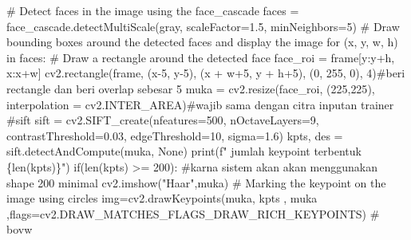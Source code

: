 \documentclass[
  letterpaper,
  DIV=11,
  numbers=noendperiod]{scrreprt}
\newenvironment{Shaded}{\begin{snugshade}}{\end{snugshade}}
\newcommand{\BuiltInTok}[1]{\textcolor[rgb]{0.00,0.23,0.31}{#1}}
\newcommand{\CommentTok}[1]{\textcolor[rgb]{0.37,0.37,0.37}{#1}}
\newcommand{\ControlFlowTok}[1]{\textcolor[rgb]{0.00,0.23,0.31}{#1}}
\newcommand{\DecValTok}[1]{\textcolor[rgb]{0.68,0.00,0.00}{#1}}
\newcommand{\FloatTok}[1]{\textcolor[rgb]{0.68,0.00,0.00}{#1}}
\newcommand{\KeywordTok}[1]{\textcolor[rgb]{0.00,0.23,0.31}{#1}}
\newcommand{\NormalTok}[1]{\textcolor[rgb]{0.00,0.23,0.31}{#1}}
\newcommand{\OperatorTok}[1]{\textcolor[rgb]{0.37,0.37,0.37}{#1}}
\newcommand{\SpecialCharTok}[1]{\textcolor[rgb]{0.37,0.37,0.37}{#1}}
\newcommand{\SpecialStringTok}[1]{\textcolor[rgb]{0.13,0.47,0.30}{#1}}
\newcommand{\StringTok}[1]{\textcolor[rgb]{0.13,0.47,0.30}{#1}}
\newcommand{\VariableTok}[1]{\textcolor[rgb]{0.07,0.07,0.07}{#1}}
\begin{document}
\begin{Shaded}
\begin{Highlighting}[]
        \CommentTok{\# Detect faces in the image using the face\_cascade}
\NormalTok{        faces }\OperatorTok{=}\NormalTok{ face\_cascade.detectMultiScale(gray, scaleFactor}\OperatorTok{=}\FloatTok{1.5}\NormalTok{, minNeighbors}\OperatorTok{=}\DecValTok{5}\NormalTok{)}
        \CommentTok{\# Draw bounding boxes around the detected faces and display the image}
        \ControlFlowTok{for}\NormalTok{ (x, y, w, h) }\KeywordTok{in}\NormalTok{ faces:}
            \CommentTok{\# Draw a rectangle around the detected face}
\NormalTok{            face\_roi }\OperatorTok{=}\NormalTok{ frame[y:y}\OperatorTok{+}\NormalTok{h, x:x}\OperatorTok{+}\NormalTok{w]}
\NormalTok{            cv2.rectangle(frame, (x}\OperatorTok{{-}}\DecValTok{5}\NormalTok{, y}\OperatorTok{{-}}\DecValTok{5}\NormalTok{), (x }\OperatorTok{+}\NormalTok{ w}\OperatorTok{+}\DecValTok{5}\NormalTok{, y }\OperatorTok{+}\NormalTok{ h}\OperatorTok{+}\DecValTok{5}\NormalTok{), (}\DecValTok{0}\NormalTok{, }\DecValTok{255}\NormalTok{, }\DecValTok{0}\NormalTok{), }\DecValTok{4}\NormalTok{)}\CommentTok{\#beri rectangle dan beri overlap sebesar 5}
\NormalTok{            muka }\OperatorTok{=}\NormalTok{ cv2.resize(face\_roi, (}\DecValTok{225}\NormalTok{,}\DecValTok{225}\NormalTok{), interpolation }\OperatorTok{=}\NormalTok{ cv2.INTER\_AREA)}\CommentTok{\#wajib sama dengan citra inputan trainer}
            \CommentTok{\#sift}
\NormalTok{            sift }\OperatorTok{=}\NormalTok{ cv2.SIFT\_create(nfeatures}\OperatorTok{=}\DecValTok{500}\NormalTok{, nOctaveLayers}\OperatorTok{=}\DecValTok{9}\NormalTok{, contrastThreshold}\OperatorTok{=}\FloatTok{0.03}\NormalTok{, edgeThreshold}\OperatorTok{=}\DecValTok{10}\NormalTok{, sigma}\OperatorTok{=}\FloatTok{1.6}\NormalTok{)}
\NormalTok{            kpts, des }\OperatorTok{=}\NormalTok{ sift.detectAndCompute(muka, }\VariableTok{None}\NormalTok{)}
            \BuiltInTok{print}\NormalTok{(}\SpecialStringTok{f" jumlah keypoint terbentuk }\SpecialCharTok{\{}\BuiltInTok{len}\NormalTok{(kpts)}\SpecialCharTok{\}}\SpecialStringTok{"}\NormalTok{)}
            \ControlFlowTok{if}\NormalTok{(}\BuiltInTok{len}\NormalTok{(kpts) }\OperatorTok{\textgreater{}=} \DecValTok{200}\NormalTok{): }\CommentTok{\#karna sistem akan akan menggunakan shape 200 minimal}
\NormalTok{                cv2.imshow(}\StringTok{"Haar"}\NormalTok{,muka)}
                \CommentTok{\# Marking the keypoint on the image using circles}
\NormalTok{                img}\OperatorTok{=}\NormalTok{cv2.drawKeypoints(muka, kpts , muka ,flags}\OperatorTok{=}\NormalTok{cv2.DRAW\_MATCHES\_FLAGS\_DRAW\_RICH\_KEYPOINTS)}
                \CommentTok{\# bovw}

\end{Highlighting}
\end{Shaded}
\end{document}

